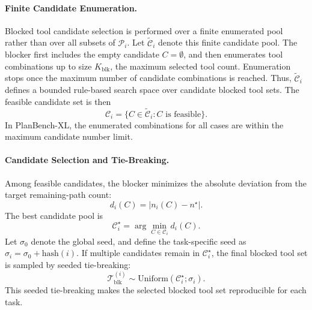 \documentclass{llmxive}
\providecommand{\bench}[1]{PlanBench-XL}
\begin{document}
\paragraph{Finite Candidate Enumeration.}
Blocked tool candidate selection is performed over a finite enumerated pool rather than over all subsets of $\mathcal{P}_i$.
Let $\widetilde{\mathcal{C}}_i$ denote this finite candidate pool.
The blocker first includes the empty candidate $C=\emptyset$, and then enumerates tool combinations up to size $K_{\mathrm{blk}}$, the maximum selected tool count.
Enumeration stops once the maximum number of candidate combinations is reached.
Thus, $\widetilde{\mathcal{C}}_i$ defines a bounded rule-based search space over candidate blocked tool sets.
The feasible candidate set is then
\begin{equation}
\mathcal{C}_i
=
\{C\in\widetilde{\mathcal{C}}_i: C \text{ is feasible}\}.
\end{equation}
In \bench{}, the enumerated combinations for all cases are within the maximum candidate number limit.

\paragraph{Candidate Selection and Tie-Breaking.}
Among feasible candidates, the blocker minimizes the absolute deviation from the target remaining-path count:
\begin{equation}
d_i(C)=|n_i(C)-n^\star|.
\end{equation}
The best candidate pool is
\begin{equation}
\mathcal{C}^{\star}_i
=
\arg\min_{C\in\mathcal{C}_i} d_i(C).
\end{equation}
Let $\sigma_0$ denote the global seed, and define the task-specific seed as $\sigma_i = \sigma_0 + \mathrm{hash}(i)$.
If multiple candidates remain in $\mathcal{C}^{\star}_i$, the final blocked tool set is sampled by seeded tie-breaking:
\begin{equation}
\mathcal{T}^{(i)}_{\mathrm{blk}}
\sim
\mathrm{Uniform}
\left(
\mathcal{C}^{\star}_i;
\sigma_i
\right).
\end{equation}
This seeded tie-breaking makes the selected blocked tool set reproducible for each task.
\end{document}
